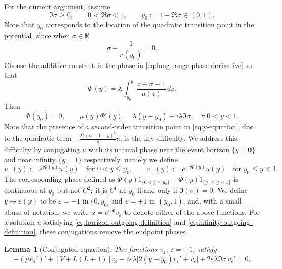 \documentclass[11pt]{article}
\numberwithin{equation}{section}
\newtheorem{lemma}[theorem]{Lemma}
\begin{document}
	For the current argument, assume
	\begin{equation}
		\Im\sigma\geq0,\qquad 0<\Re\sigma<1,
		\qquad y_0:=1-\Re\sigma\in(0,1).
		\label{eq:current-parameter-range}
	\end{equation}  Note that $y_0$ corresponds to the location of the quadratic transition point in the potential, since when $\sigma \in \mathbb{R}$ \begin{equation}
		\sigma-\frac{1}{r(y_0)}=0.  
	\end{equation}
	Choose the additive constant in the phase in \eqref{eq:long-range-phase-derivative} so that
	\begin{equation}
		\Phi(y) =\lambda\int_{y_0}^{y}\frac{z+\sigma-1}{\mu(z)}\,dz.
		\label{eq:Phi-definition}
	\end{equation}
	Then
	\begin{equation}
		\Phi(y_0)=0,\qquad
		\mu(y)\Phi'(y)=\lambda(y-y_0)+i\lambda\Im\sigma, \quad \forall\, 0 < y < 1.
		\label{eq:phase-derivative}
	\end{equation}
	Note that the presence of a second-order transition point in \eqref{eq:y-equation}, due to the quadratic term $-\frac{\lambda^2(\sigma-1+y)^2}{\mu} u$, is the key difficulty. We address this difficulty by conjugating $u$ with its natural phase near the event horizon $\{y=0\}$ and near infinity $\{y=1\}$ respectively, namely we define
	\begin{equation}
		v_-(y):=e^{i\Phi(y)}u(y)\quad\text{for } 0<y\leq y_0,
		\qquad
		v_+(y):=e^{-i\Phi(y)}u(y)\quad\text{for }y_0\leq y<1.
		\label{eq:two-sided-conjugation}
	\end{equation}The corresponding phase defined as $\Phi(y) 1_{\{ 0<y\leq y_0 \}}- \Phi(y) 1_{\{ y_0 \leq y< 1 \}}$ is continuous at $y_0$ but not $C^2$; it is $C^1$ at $y_0$ if and only if $\Im(\sigma)=0$. 
	We define $y \mapsto \varepsilon(y)$ to be $\varepsilon=-1$ in $(0, y_0]$ and $\varepsilon=+1$ in $(y_0, 1)$,
	and, with a small abuse of notation, we write $u=e^{i\varepsilon\Phi}v_\varepsilon$ to denote either of the above functions. For a solution $u$ satisfying \eqref{eq:horizon-outgoing-definition} and \eqref{eq:infinity-outgoing-definition}, these conjugations
	remove the endpoint phases. 
	
	\begin{lemma}[Conjugated equation]
		\label{lem:conjugated-equation}
		The functions $v_\varepsilon$, $\varepsilon=\pm1$, satisfy
		\begin{equation}
			-(\mu v_\varepsilon')'+[V+L(L+1)]v_\varepsilon
			-i\varepsilon\lambda
			\bigl[2(y-y_0)v_\varepsilon'+v_\varepsilon\bigr]
			+2\varepsilon\lambda\Im\sigma\,v_\varepsilon'=0.
			\label{eq:conjugated-equation}
		\end{equation}
	\end{lemma}
	
\end{document}
